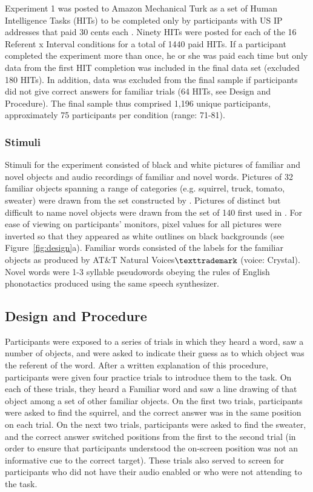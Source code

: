 \documentclass[man,floatsintext]{apa6}
\begin{document}
Experiment 1 was posted to Amazon Mechanical Turk as a set of Human Intelligence Tasks (HITs) to be completed only by participants with US IP addresses that paid 30 cents each \cite<for a detailed comparison of laboratory and Mechanical Turk studies see>{Crump2013}. Ninety HITs were posted for each of the 16 Referent x Interval conditions for a total of 1440 paid HITs. If a participant completed the experiment more than once, he or she was paid each time but only data from the first HIT completion was included in the final data set (excluded 180 HITs). In addition, data was excluded from the final sample if participants did not give correct answers for familiar trials (64 HITs, see Design and Procedure). The final sample thus comprised 1,196 unique participants, approximately 75 participants per condition (range: 71-81).

\subsubsection{Stimuli}

Stimuli for the experiment consisted of black and white pictures of familiar and novel objects and audio recordings of familiar and novel words. Pictures of 32 familiar objects spanning a range of categories (e.g. squirrel, truck, tomato, sweater) were drawn from the set constructed by . Pictures of distinct but difficult to name novel objects were drawn from the set of 140 first used in . For ease of viewing on participants' monitors, pixel values for all pictures were inverted so that they appeared as white outlines on black backgrounds (see Figure~\ref{fig:design}a). Familiar words consisted of the labels for the familiar objects as produced by AT\&T Natural Voices$\texttrademark$ (voice: Crystal). Novel words were 1-3 syllable pseudowords obeying the rules of English phonotactics produced using the same speech synthesizer. 
\subsection{Design and Procedure}

Participants were exposed to a series of trials in which they heard a word, saw a number of objects, and were asked to indicate their guess as to which object was the referent of the word. After a written explanation of this procedure, participants were given four practice trials to introduce them to the task. On each of these trials, they heard a Familiar word and saw a line drawing of that object among a set of other familiar objects. On the first two trials, participants were asked to find the squirrel, and the correct answer was in the same position on each trial. On the next two trials, participants were asked to find the sweater, and the correct answer switched positions from the first to the second trial (in order to ensure that participants understood the on-screen position was not an informative cue to the correct target). These trials also served to screen for participants who did not have their audio enabled or who were not attending to the task.
\end{document}
